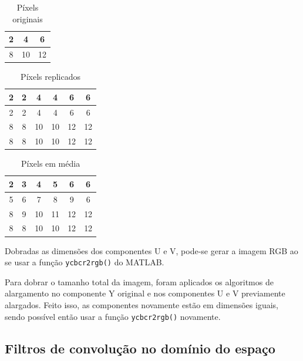 \documentclass[conference]{IEEEtran}
\begin{document}
\begin{table}
    \caption{Píxels originais}
    \centering
    \begin{tabular}{|c|c|c|}
        \hline
        2 & 4 & 6 \\
        \hline
        8 & 10 & 12 \\
        \hline
    \end{tabular}
    \label{tab:q1_m_original}
\end{table}

\begin{table}
    \caption{Píxels replicados}
    \centering
    \begin{tabular}{|c|c|c|c|c|c|}
        \hline
        2 & 2 & 4 & 4 & 6 & 6 \\
        \hline
        2 & 2 & 4 & 4 & 6 & 6 \\
        \hline
        8 & 8 & 10 & 10 & 12 & 12 \\
        \hline
        8 & 8 & 10 & 10 & 12 & 12 \\
        \hline
    \end{tabular}
    \label{tab:q1_m_replicated}
\end{table}

\begin{table}
    \caption{Píxels em média}
    \centering
    \begin{tabular}{|c|c|c|c|c|c|}
        \hline
        2 & 3 & 4 & 5 & 6 & 6 \\
        \hline
        5 & 6 & 7 & 8 & 9 & 6 \\
        \hline
        8 & 9 & 10 & 11 & 12 & 12 \\
        \hline
        8 & 8 & 10 & 10 & 12 & 12 \\
        \hline
    \end{tabular}
    \label{tab:q1_m_average}
\end{table}

Dobradas as dimensões dos componentes U e V, pode-se gerar a imagem RGB ao se usar a função \texttt{ycbcr2rgb()} do MATLAB.

Para dobrar o tamanho total da imagem, foram aplicados os algoritmos de alargamento no componente Y original e nos componentes U e V previamente alargados. Feito isso, as componentes novamente estão em dimensões iguais, sendo possível então usar a função \texttt{ycbcr2rgb()} novamente.


\subsection{Filtros de convolução no domínio do espaço}
\end{document}
